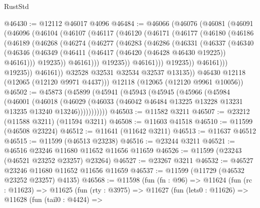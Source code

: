 \begin{lexlean}{RustStd}
\begin{coremodule}
@46430 := @12112 @46017 @4096
@46484 := @46066
    (@46076
      (@46081
        (@46091
          (@46096
            (@46104
              (@46107
                (@46117
                  (@46120
                    (@46171
                      (@46177
                        (@46180
                          (@46186
                            (@46189
                              (@46268
                                (@46274
                                  (@46277
                                    (@46283
                                      (@46286
                                        (@46331
                                          (@46337
                                            (@46340
                                              (@46346
                                                (@46349
                                                  (@46411
                                                    (@46417
                                                      (@46420 (@46428 @46430 @19225))
                                                      @46161)))
                                                @19235))
                                            @46161)))
                                      @19235))
                                  @46161)))
                            @19235))
                        @46161)))
                  @19235))
              @46161))
          @32528
          @32531
          @32534
          @32537
          @13135))
      @46430
      @12118
      (@12065 (@12120 @9971 @4437)))
    @12118
    (@12065 (@12120 @9961 @10056))
@46502 := @45873
    (@45899
      (@45941
        (@45943
          (@45945
            (@45966
              (@45984
                (@46001
                  (@46018
                    (@46029
                      (@46033 (@46042 @46484 @13225 @13228 @13231 @13235 @13240 @13246)))))))))))
@46503 := @11582 @3211
@46507 := @23212 (@11588 @3211) (@11594 @3211)
@46508 := @11603 @41518
@46510 := @11599 (@46508 @23224)
@46512 := @11641 (@11642 @3211)
@46513 := @11637 @46512
@46515 := @11599 (@46513 @23238)
@46516 := @23244 @3211
@46521 := @46516 @23246 @11680 @11652 @11656 @11659
@46526 := @11599 (@23243 (@46521 @23252 @23257) @23264)
@46527 := @23267 @3211
@46532 := @46527 @23246 @11680 @11652 @11656 @11659
@46537 := @11599 (@11729 (@46532 @23252 @23257) @4135)
@46568 := @11598
    (fun (fn : @96) =>
    @11624
      (fun (rc : @11623) =>
      @11625
        (fun (rty : @3975) =>
        @11627
          (fun (lets0 : @11626) =>
          @11628
            (fun (tail0 : @4424) =>

\end{coremodule}
\end{lexlean}

